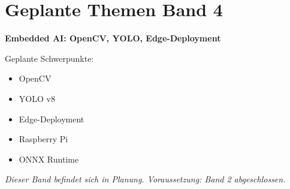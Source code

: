 \chapter*{Geplante Themen Band 4}

\textbf{Embedded AI: OpenCV, YOLO, Edge-Deployment}

\bigskip
Geplante Schwerpunkte:
\begin{itemize}
    \item OpenCV
    \item YOLO v8
    \item Edge-Deployment
    \item Raspberry Pi
    \item ONNX Runtime
\end{itemize}

\bigskip
\textit{Dieser Band befindet sich in Planung. Voraussetzung: Band 2 abgeschlossen.}

